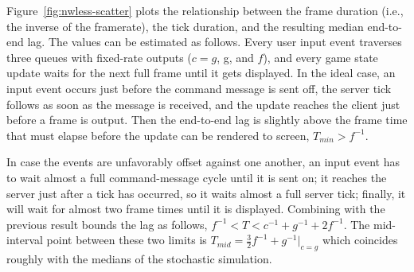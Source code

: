 Figure~\ref{fig:nwless-scatter} plots the relationship between the frame duration (i.e., the inverse of the framerate), the tick duration, and the resulting median end-to-end lag.
%
%
The values can be estimated as follows. Every user input 
event traverses three queues with fixed-rate outputs ($c=g$, g, and $f$), 
and every game state update waits for the next full frame until it gets 
displayed. In the ideal case, an input event occurs just before the command 
message is sent off, the server tick follows as soon as the message is 
received, and the update reaches the client just before a frame is output. 
Then the end-to-end lag is slightly above the frame time that must elapse 
before the update can be rendered to screen, $T_{min}>f^{-1}$.

In case the events are unfavorably offset against one 
another, an input event has to wait almost a full command-message cycle 
until it is sent on; it reaches the server just after a tick has 
occurred, so it waits almost a full server tick; finally, it will wait 
for almost two frame times until it is displayed. Combining with the 
previous result bounds the lag as follows, 
$f^{-1} < T < c^{-1}+g^{-1}+2f^{-1}$. The mid-interval point between 
these two limits is $T_{mid}=\frac{3}{2} f^{-1} + g^{-1}|_{c=g}$ which 
coincides roughly with the medians of the stochastic simulation.


